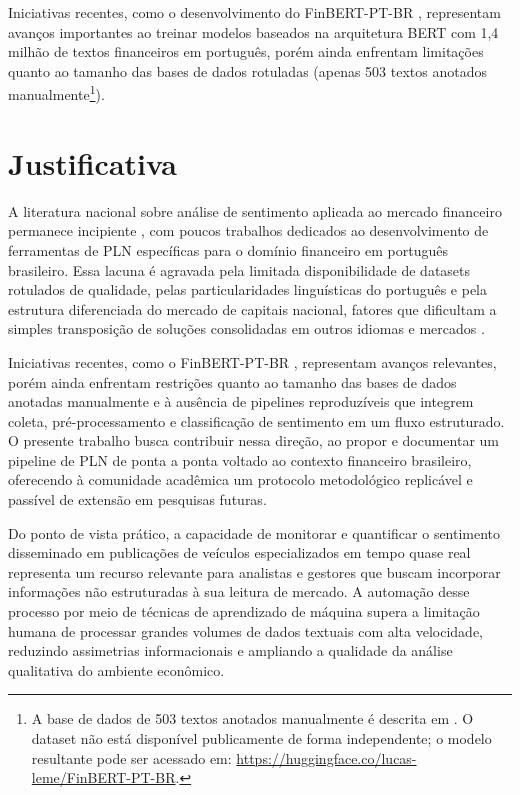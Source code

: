 Iniciativas recentes, como o desenvolvimento do FinBERT-PT-BR \cite{santos2023finbert}, representam avanços importantes ao treinar modelos baseados na arquitetura BERT com 1,4 milhão de textos financeiros em português, porém ainda enfrentam limitações quanto ao tamanho das bases de dados rotuladas (apenas 503 textos anotados manualmente\footnote{A base de dados de 503 textos anotados manualmente é descrita em . O dataset não está disponível publicamente de forma independente; o modelo resultante pode ser acessado em: \url{https://huggingface.co/lucas-leme/FinBERT-PT-BR}.}).


\section{Justificativa}

A literatura nacional sobre análise de sentimento aplicada ao mercado financeiro permanece incipiente \cite{galdi2018}, com poucos trabalhos dedicados ao desenvolvimento de ferramentas de PLN específicas para o domínio financeiro em português brasileiro. Essa lacuna é agravada pela limitada disponibilidade de datasets rotulados de qualidade, pelas particularidades linguísticas do português e pela estrutura diferenciada do mercado de capitais nacional, fatores que dificultam a simples transposição de soluções consolidadas em outros idiomas e mercados \cite{santos2023finbert}.

Iniciativas recentes, como o FinBERT-PT-BR \cite{santos2023finbert}, representam avanços relevantes, porém ainda enfrentam restrições quanto ao tamanho das bases de dados anotadas manualmente e à ausência de pipelines reproduzíveis que integrem coleta, pré-processamento e classificação de sentimento em um fluxo estruturado. O presente trabalho busca contribuir nessa direção, ao propor e documentar um pipeline de PLN de ponta a ponta voltado ao contexto financeiro brasileiro, oferecendo à comunidade acadêmica um protocolo metodológico replicável e passível de extensão em pesquisas futuras.

Do ponto de vista prático, a capacidade de monitorar e quantificar o sentimento disseminado em publicações de veículos especializados em tempo quase real representa um recurso relevante para analistas e gestores que buscam incorporar informações não estruturadas à sua leitura de mercado. A automação desse processo por meio de técnicas de aprendizado de máquina supera a limitação humana de processar grandes volumes de dados textuais com alta velocidade, reduzindo assimetrias informacionais e ampliando a qualidade da análise qualitativa do ambiente econômico.



